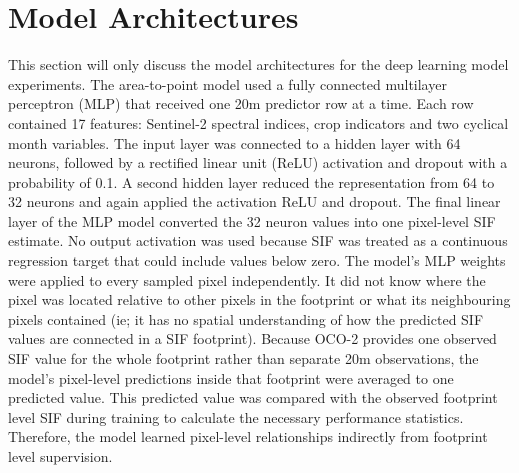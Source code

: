 \section{Model Architectures}

This section will only discuss the model architectures for the deep learning model experiments. The area-to-point model used a fully connected multilayer perceptron (MLP) that received one 20m predictor row at a time. Each row contained 17 features: Sentinel-2 spectral indices, crop indicators and two cyclical month variables. The input layer was connected to a hidden layer with 64 neurons, followed by a rectified linear unit (ReLU) activation and dropout with a probability of 0.1. A second hidden layer reduced the representation from 64 to 32 neurons and again applied the activation ReLU and dropout. The final linear layer of the MLP model converted the 32 neuron values into one pixel-level SIF estimate. No output activation was used because SIF was treated as a continuous regression target that could include values below zero. The model's MLP weights were applied to every sampled pixel independently. It did not know where the pixel was located relative to other pixels in the footprint or what its neighbouring pixels contained (ie; it has no spatial understanding of how the predicted SIF values are connected in a SIF footprint). Because OCO-2 provides one observed SIF value for the whole footprint rather than separate 20m observations, the model’s pixel-level predictions inside that footprint were averaged to one predicted value. This predicted value was compared with the observed footprint level SIF during training to calculate the necessary performance statistics. Therefore, the model learned pixel-level relationships indirectly from footprint level supervision.

